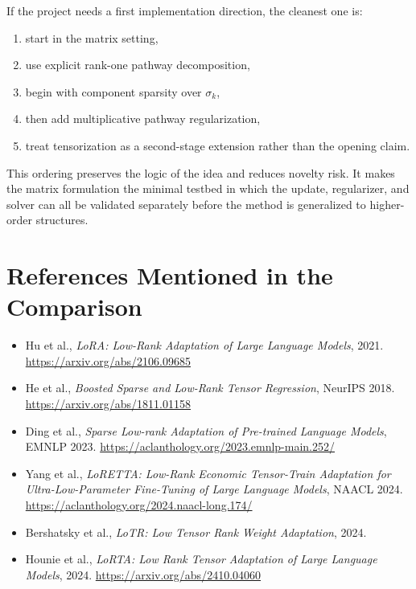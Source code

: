 \documentclass[11pt]{article}
\begin{document}
If the project needs a first implementation direction, the cleanest one is:

\begin{enumerate}
\item start in the matrix setting,
\item use explicit rank-one pathway decomposition,
\item begin with component sparsity over $\sigma_k$,
\item then add multiplicative pathway regularization,
\item treat tensorization as a second-stage extension rather than the opening claim.
\end{enumerate}

This ordering preserves the logic of the idea and reduces novelty risk. It makes the matrix formulation the minimal testbed in which the update, regularizer, and solver can all be validated separately before the method is generalized to higher-order structures.

\section{References Mentioned in the Comparison}

\begin{itemize}
\item Hu et al., \emph{LoRA: Low-Rank Adaptation of Large Language Models}, 2021. \url{https://arxiv.org/abs/2106.09685}
\item He et al., \emph{Boosted Sparse and Low-Rank Tensor Regression}, NeurIPS 2018. \url{https://arxiv.org/abs/1811.01158}
\item Ding et al., \emph{Sparse Low-rank Adaptation of Pre-trained Language Models}, EMNLP 2023. \url{https://aclanthology.org/2023.emnlp-main.252/}
\item Yang et al., \emph{LoRETTA: Low-Rank Economic Tensor-Train Adaptation for Ultra-Low-Parameter Fine-Tuning of Large Language Models}, NAACL 2024. \url{https://aclanthology.org/2024.naacl-long.174/}
\item Bershatsky et al., \emph{LoTR: Low Tensor Rank Weight Adaptation}, 2024.
\item Hounie et al., \emph{LoRTA: Low Rank Tensor Adaptation of Large Language Models}, 2024. \url{https://arxiv.org/abs/2410.04060}
\end{itemize}
\end{document}
